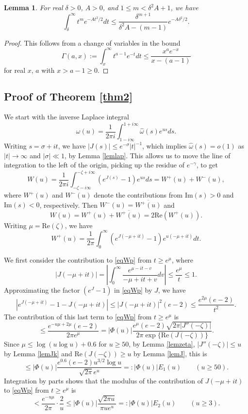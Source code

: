 \documentclass[11pt]{amsart}
\newtheorem{lemma}{Lemma}
\begin{document}
\begin{lemma}\label{lemtail}
For real $\delta >0$, $A>0$, and $1\le m < \delta^2 A+1$, we have
$$
\int_\delta^\infty t^m e^{-A t^2/2} dt \le \frac{\delta^{m+1}}{\delta^2 A - (m-1)} e^{-A\delta^2/2}.
$$
\end{lemma}
\begin{proof}
This follows from a change of variables in the bound \cite[Prop.~2.7]{Pin} 
$$
\Gamma(a,x):=\int_x^\infty t^{a-1} e^{-t} dt \le \frac{x^a e^{-x}}{x-(a-1)}
$$
for real $x$, $a$ with $x>a-1\ge 0$.
\end{proof}



\subsection{Proof of Theorem \ref{thm2}}
We start with the inverse Laplace integral
\begin{equation*}\label{eqlapinv}
\omega(u)  =\frac{1}{2\pi i} \int_{1-i\infty}^{1+i\infty} \widehat{\omega}(s) e^{us} ds.
\end{equation*}
Writing $s=\sigma+it$, we have $|J(s)| \le e^{-\sigma} |t|^{-1}$, 
which implies $\widehat{\omega}(s) =o(1)$ as $|t|\to \infty$ and $|\sigma|\ll 1$,
by Lemma \ref{lemlap}. 
This allows us to move the line of integration to the left of the origin, picking up the residue of $e^{-\gamma}$, to get
\begin{equation}\label{Wint}
W(u)=\frac{1}{2\pi i} \int_{-\zeta-i\infty}^{-\zeta+i\infty}  (e^{J(s)}-1)e^{us} ds = W^+(u)+W^-(u),
\end{equation}
where $W^+(u)$ and $W^-(u)$ denote the contributions from $\mathrm{Im}(s)>0$ and $\mathrm{Im}(s)<0$,
respectively. Then $W^-(u)=\overline{W^+(u)}$ and 
$$W(u)=W^+(u)+\overline{W^+(u)}= 2 \mathrm{Re}(W^+(u)) .$$
Writing $\mu = \mathrm{Re}(\zeta)$, we have
\begin{equation}\label{eqWp}
W^+(u)=\frac{1}{2\pi } \int_{0}^{\infty}  (e^{J(-\mu+it)}-1)e^{u(-\mu+it)} dt.
\end{equation}

We first consider the contribution to \eqref{eqWp} from $t \ge e^\mu$, where
$$
|J(-\mu+i t)| = \left|\int_0^\infty \frac{e^{\mu - i t -v}}{-\mu+it+v} dv \right|\le \frac{e^{\mu}}{t}\le 1.
$$ 
Approximating the factor $(e^J-1)$ in \eqref{eqWp} by $J$, we have
$$
|e^{J(-\mu+it)} -1 - J(-\mu+it)| \le |J(-\mu+it)|^2 (e-2) \le \frac{e^{2\mu} (e-2)}{t^2}.
$$
The contribution of this last term to \eqref{eqWp} from $t \ge e^\mu$ is
$$
\le \frac{e^{-u\mu+ 2\mu} (e-2)}{2\pi  e^\mu}=
 |\Phi(u)|\frac{e^{\mu}(e-2) \sqrt{2 \pi |J''(-\zeta)|}}{2\pi \exp\{\mathrm{Re}(J(-\zeta))\}}.
$$
Since $\mu \le \log(u\log u)+0.6$ for $u\ge 50$, by Lemma \ref{lemzeta}, $|J''(-\zeta)|\le u$ by Lemma \ref{lemJk} and $\mathrm{Re}(J(-\zeta))\ge u$
by Lemma \ref{lemJ}, this is 
$$
\le  |\Phi(u)|\frac{ e^{0.6} (e-2) u^{3/2}\log u }{\sqrt{2\pi}  e^u} =: |\Phi(u)| E_1(u) \qquad (u\ge 50).
$$
Integration by parts shows that the modulus of the contribution of $J(-\mu+it)$ to \eqref{eqWp} from $t \ge e^\mu$ is
$$
< \frac{e^{-u\mu}}{2 \pi}\cdot \frac{2}{u}
\le  |\Phi(u)|\frac{\sqrt{2 \pi u}}{\pi u e^u}
=: |\Phi(u)| E_2(u)\qquad (u\ge 3).
$$
\end{document}
